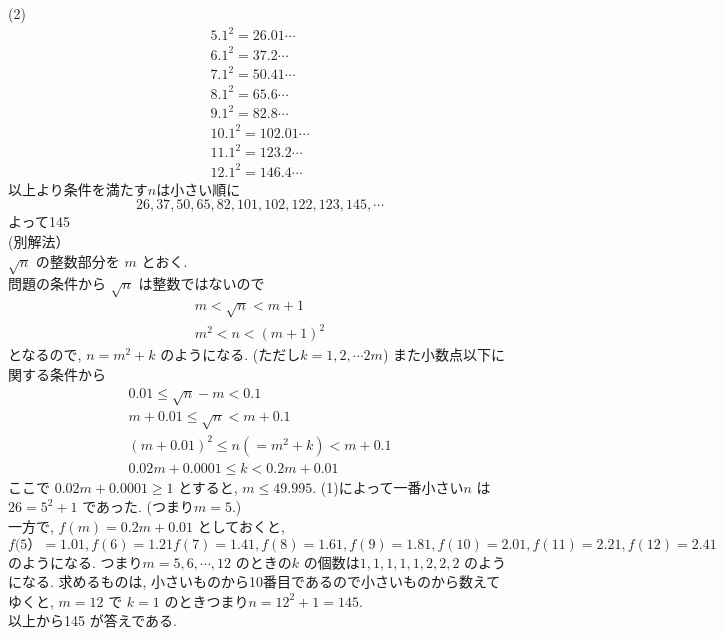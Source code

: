 \documentclass[main]{subfiles}
\begin{document}
(2)
\begin{align*}
5.1^2=26.01\cdots
\\6.1^2=37.2\cdots
\\7.1^2=50.41\cdots
\\8.1^2=65.6\cdots
\\9.1^2=82.8\cdots
\\10.1^2=102.01\cdots
\\11.1^2=123.2\cdots
\\12.1^2=146.4\cdots
\end{align*}
以上より条件を満たす$n$は小さい順に
$$
26,37,50,65,82,101,102,122,123,145,\cdots
$$
よって145 \\

(別解法） \\
$\sqrt{n}$ の整数部分を $m$ とおく.　\\
問題の条件から $\sqrt{n}$ は整数ではないので
\begin{align*}
 m < \sqrt{n} < m + 1 \\
 m^2 < n < (m+1)^2
\end{align*}
となるので, $n=m^2 + k$ のようになる. (ただし$k =1, 2, \cdots 2m$)
また小数点以下に関する条件から
\begin{align*}
0.01 \le \sqrt{n} -m < 0.1 \\
m + 0.01 \le \sqrt{n} < m + 0.1 \\
(m + 0.01)^2 \le n (=m^2 + k) < m + 0.1 \\
0.02m + 0.0001 \le k < 0.2m + 0.01
\end{align*}
ここで $0.02m + 0.0001 \ge 1$ とすると, $m \le 49.995$.
(1)によって一番小さい$n$ は $26 = 5^2 +1$ であった. (つまり$m=5$.) \\
一方で, $f(m) = 0.2m + 0.01 $ としておくと,
$f(5）= 1.01 , f(6) = 1.21 f(7) = 1.41,  f(8) = 1.61,  f(9) = 1.81,  f(10) = 2.01, f(11) = 2.21, f(12) = 2.41$
のようになる. つまり$m=5, 6, \cdots, 12$ のときの$k$ の個数は$1, 1, 1, 1, 1, 2, 2, 2$ のようになる.
求めるものは, 小さいものから10番目であるので小さいものから数えてゆくと,
$m=12$ で $k=1$ のときつまり$n=12^2 +1 = 145$. \\
以上から145 が答えである.
\end{document}
